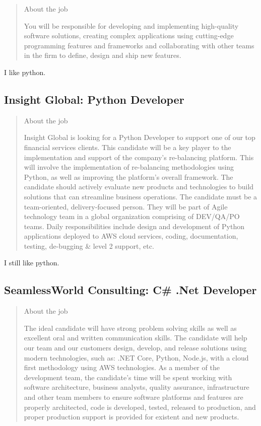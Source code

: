 \documentclass[
	letterpaper, %
	12pt, %
]{CSSullivanBusinessReport}
\begin{document}
\begin{quote}
	About the job
	
	You will be responsible for developing and implementing high-quality software solutions, creating complex applications using cutting-edge programming features and frameworks and collaborating with other teams in the firm to define, design and ship new features.

\end{quote}

I like python.

\subsection[Insight Global]{Insight Global: Python Developer}

\begin{quote}
	About the job
	
	Insight Global is looking for a Python Developer to support one of our top financial services clients. This candidate will be a key player to the implementation and support of the company's re-balancing platform. This will involve the implementation of re-balancing methodologies using Python, as well as improving the platform's overall framework. The candidate should actively evaluate new products and technologies to build solutions that can streamline business operations. The candidate must be a team-oriented, delivery-focused person. They will be part of Agile technology team in a global organization comprising of DEV/QA/PO teams. Daily responsibilities include design and development of Python applications deployed to AWS cloud services, coding, documentation, testing, de-bugging \& level 2 support, etc.

\end{quote}

I still like python.


\subsection[SeamlessWorld Consulting]{SeamlessWorld Consulting: C\# .Net Developer}

\begin{quote}
	About the job
	
	The ideal candidate will have strong problem solving skills as well as excellent oral and written communication skills. The candidate will help our team and our customers design, develop, and release solutions using modern technologies, such as: .NET Core, Python, Node.js, with a cloud first methodology using AWS technologies. As a member of the development team, the candidate's time will be spent working with software architecture, business analysts, quality assurance, infrastructure and other team members to ensure software platforms and features are properly architected, code is developed, tested, released to production, and proper production support is provided for existent and new products. 

\end{quote}
\end{document}
